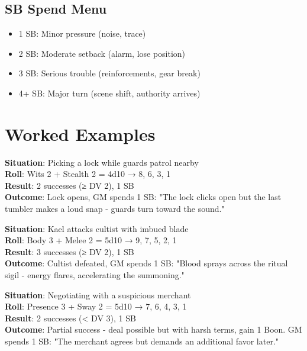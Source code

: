 \documentclass[11pt]{article}
\begin{document}
\subsection{SB Spend Menu}
\begin{itemize}
    \item 1 SB: Minor pressure (noise, trace)
    \item 2 SB: Moderate setback (alarm, lose position)
    \item 3 SB: Serious trouble (reinforcements, gear break)
    \item 4+ SB: Major turn (scene shift, authority arrives)
\end{itemize}

\section{Worked Examples}

\begin{examplebox}
\textbf{Situation}: Picking a lock while guards patrol nearby\\
\textbf{Roll}: Wits 2 + Stealth 2 = 4d10 → {8, 6, 3, 1}\\
\textbf{Result}: 2 successes (≥ DV 2), 1 SB\\
\textbf{Outcome}: Lock opens, GM spends 1 SB: "The lock clicks open but the last tumbler makes a loud snap - guards turn toward the sound."
\end{examplebox}

\begin{examplebox}
\textbf{Situation}: Kael attacks cultist with imbued blade\\
\textbf{Roll}: Body 3 + Melee 2 = 5d10 → {9, 7, 5, 2, 1}\\
\textbf{Result}: 3 successes (≥ DV 2), 1 SB\\
\textbf{Outcome}: Cultist defeated, GM spends 1 SB: "Blood sprays across the ritual sigil - energy flares, accelerating the summoning."
\end{examplebox}

\begin{examplebox}
\textbf{Situation}: Negotiating with a suspicious merchant\\
\textbf{Roll}: Presence 3 + Sway 2 = 5d10 → {7, 6, 4, 3, 1}\\
\textbf{Result}: 2 successes (< DV 3), 1 SB\\
\textbf{Outcome}: Partial success - deal possible but with harsh terms, gain 1 Boon. GM spends 1 SB: "The merchant agrees but demands an additional favor later."
\end{examplebox}
\end{document}

